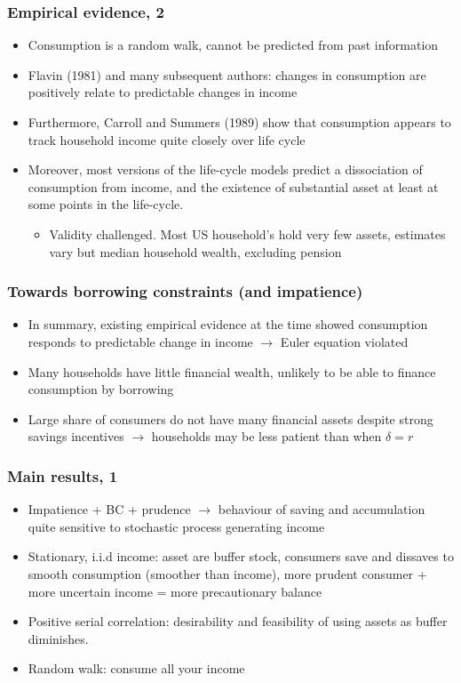 \documentclass[mathserif]{beamer}
\begin{document}
\begin{frame}
\frametitle{Empirical evidence, 2}
\begin{itemize}
  \setlength\itemsep{1em}
  \item Consumption is a random walk, cannot be predicted from past information
  \item Flavin (1981) and many subsequent authors: changes in consumption are positively relate to predictable changes in income
  \item Furthermore, Carroll and Summers (1989)  show that consumption appears to track household income quite closely over life cycle
  \item Moreover, most versions of the life-cycle models predict a dissociation of consumption from income, and the existence of substantial asset at least at some points in the life-cycle. 
      \begin{itemize}
        \item Validity challenged. Most US household's hold very few assets, estimates vary but median household wealth, excluding pension
      \end{itemize}
  \end{itemize}
\end{frame}

\begin{frame}
\frametitle{Towards borrowing constraints (and impatience)}
\begin{itemize}
  \setlength\itemsep{1em}
  \item In summary, existing empirical evidence at the time showed consumption responds to predictable change in income $\rightarrow$ Euler equation violated
  \item Many households have little financial wealth, unlikely to be able to finance consumption by borrowing
  \item Large share of consumers do not have many financial assets despite strong savings incentives $\rightarrow$ households may be less patient than when \(\delta = r\)
\end{itemize}
\end{frame}

\begin{frame}
\frametitle{Main results, 1}
\begin{itemize}
  \setlength\itemsep{1em}
  \item Impatience + BC + prudence $\rightarrow$ behaviour of saving and accumulation quite sensitive to stochastic process generating income
  \item Stationary, i.i.d income: asset are buffer stock, consumers save and dissaves to smooth consumption (smoother than income), more prudent consumer + more uncertain income = more precautionary balance
  \item Positive serial correlation: desirability and feasibility of using assets as buffer diminishes.
  \item Random walk: consume all your income
\end{itemize}
\end{frame}
\end{document}
